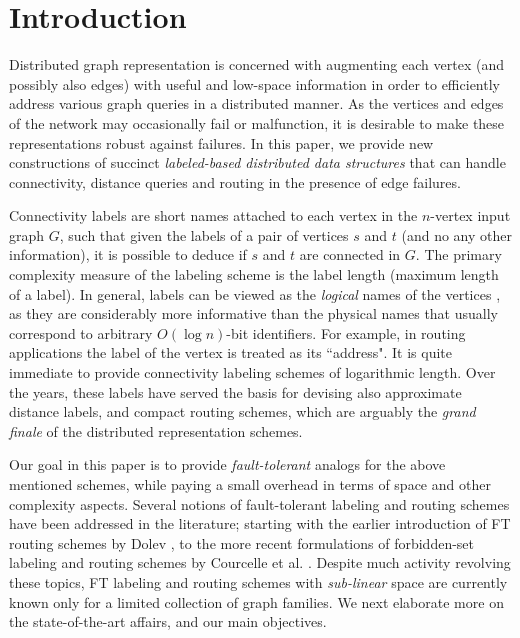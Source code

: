 \section{Introduction}
Distributed graph representation is concerned with augmenting each vertex (and possibly also edges) with useful and low-space information in order to efficiently address various graph queries in a distributed manner. As the
vertices and edges of the network may occasionally fail or malfunction, it is desirable
to make these representations robust against failures. In this paper, we provide new constructions of succinct \emph{labeled-based distributed data structures} that can handle connectivity, distance queries and routing in the presence of edge failures. 

Connectivity labels are short names attached to each vertex in the $n$-vertex input graph $G$, such that given the labels of a pair of vertices $s$ and $t$ (and no any other information), it is possible to deduce if $s$ and $t$ are connected in $G$. The primary complexity measure of the  labeling scheme is the label length (maximum length of a label). In general, labels can be viewed as the \emph{logical} names of the vertices \cite{kannan1992implicat,peleg2005informative}, as they are considerably more informative than the physical names that usually correspond to arbitrary $O(\log n)$-bit identifiers. For example, in routing applications the label of the vertex is treated as its ``address". It is quite immediate to provide connectivity labeling schemes of logarithmic length. Over the years, these labels have served the basis for devising also approximate distance labels, and compact routing schemes, which are arguably the \emph{grand finale} of the distributed representation schemes. 


Our goal in this paper is to provide \emph{fault-tolerant} analogs for the above mentioned schemes, while paying a small overhead in terms of space and other complexity aspects. Several notions of fault-tolerant labeling and routing schemes have been addressed in the literature; starting with the earlier introduction of FT routing schemes by Dolev \cite{dolev1984new}, to the more recent formulations of forbidden-set labeling and routing schemes by Courcelle et al. \cite{courcelle2007forbidden,CourcelleT07}. Despite much activity revolving these topics, FT labeling and routing schemes with \emph{sub-linear} space are currently known only for a limited collection of graph families. We next elaborate more on the state-of-the-art affairs, and our main objectives.
%
%


